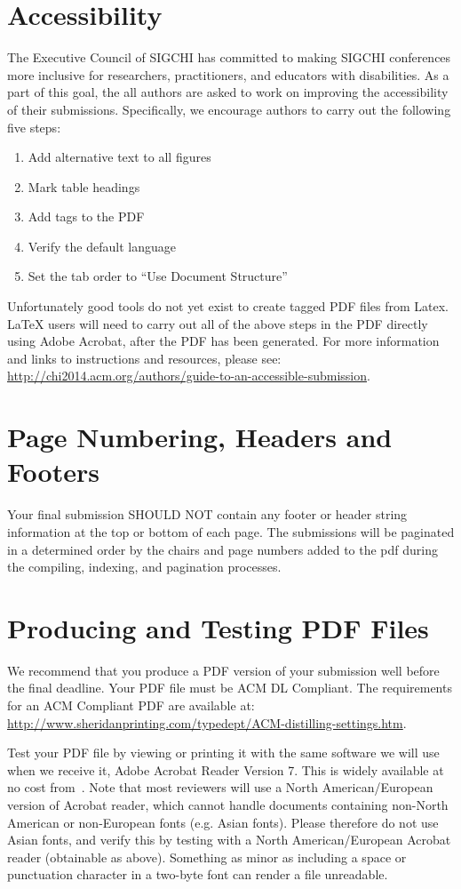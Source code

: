 \documentclass{sigchi}
\begin{document}
\section{Accessibility}
The Executive Council of SIGCHI has committed to making SIGCHI conferences more inclusive for researchers, practitioners, and educators with disabilities. As a part of this goal, the all authors are asked to work on improving the accessibility of their submissions. Specifically, we encourage authors to carry out the following five steps:
\begin{enumerate}
        \item Add alternative text to all figures
        \item Mark table headings
        \item Add tags to the PDF
        \item Verify the default language
        \item Set the tab order to ``Use Document Structure''
\end{enumerate}
Unfortunately good tools do not yet exist to create tagged PDF files from Latex. LaTeX users will need to carry out all of the above steps in the PDF directly using Adobe Acrobat, after the PDF has been generated.
For more information and links to instructions and resources, please see:
{\url{http://chi2014.acm.org/authors/guide-to-an-accessible-submission}}.

\section{Page Numbering, Headers and Footers}
Your final submission SHOULD NOT contain any footer or header string information
at the top or bottom of each page. The submissions will be paginated in a determined
order by the chairs and page numbers added to the pdf during the compiling,
indexing, and pagination processes.

\section{Producing and Testing PDF Files}

We recommend that you produce a PDF version of your submission well
before the final deadline. Your PDF file must be ACM DL
Compliant. The requirements for an ACM Compliant PDF are available at:
{\url{http://www.sheridanprinting.com/typedept/ACM-distilling-settings.htm}}.

Test your PDF file by viewing or printing it with the same software we
will use when we receive it, Adobe Acrobat Reader Version 7. This is
widely available at no cost from~\cite{acrobat}. Note that most
reviewers will use a North American/European version of Acrobat
reader, which cannot handle documents containing non-North American or
non-European fonts (e.g. Asian fonts). Please therefore do not use
Asian fonts, and verify this by testing with a North American/European
Acrobat reader (obtainable as above). Something as minor as including
a space or punctuation character in a two-byte font can render a file
unreadable.
\end{document}
